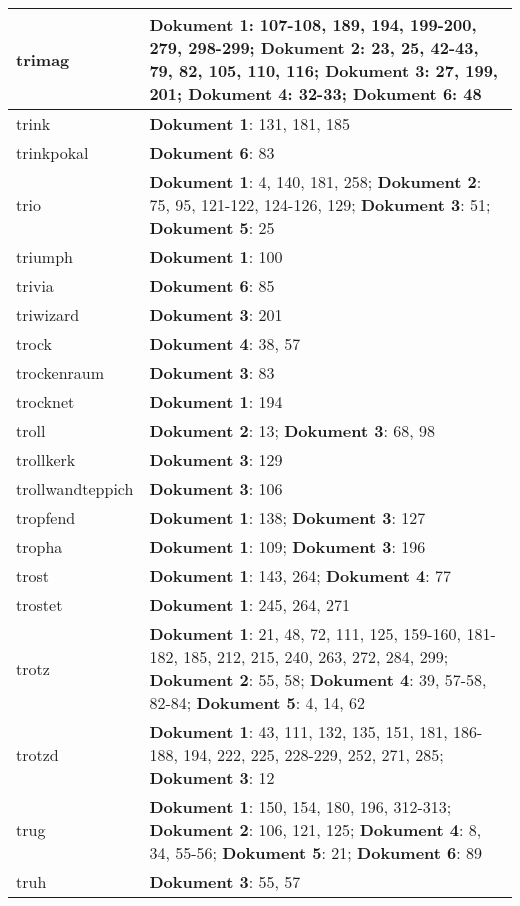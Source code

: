 \documentclass[a5paper]{article}
\begin{document}
\begin{longtable}[l]{|l|p{3in}|}
\hline
trimag & \textbf{Dokument 1}: 107-108, 189, 194, 199-200, 279, 298-299; \textbf{Dokument 2}: 23, 25, 42-43, 79, 82, 105, 110, 116; \textbf{Dokument 3}: 27, 199, 201; \textbf{Dokument 4}: 32-33; \textbf{Dokument 6}: 48 \\
\hline
trink & \textbf{Dokument 1}: 131, 181, 185 \\
\hline
trinkpokal & \textbf{Dokument 6}: 83 \\
\hline
trio & \textbf{Dokument 1}: 4, 140, 181, 258; \textbf{Dokument 2}: 75, 95, 121-122, 124-126, 129; \textbf{Dokument 3}: 51; \textbf{Dokument 5}: 25 \\
\hline
triumph & \textbf{Dokument 1}: 100 \\
\hline
trivia & \textbf{Dokument 6}: 85 \\
\hline
triwizard & \textbf{Dokument 3}: 201 \\
\hline
trock & \textbf{Dokument 4}: 38, 57 \\
\hline
trockenraum & \textbf{Dokument 3}: 83 \\
\hline
trocknet & \textbf{Dokument 1}: 194 \\
\hline
troll & \textbf{Dokument 2}: 13; \textbf{Dokument 3}: 68, 98 \\
\hline
trollkerk & \textbf{Dokument 3}: 129 \\
\hline
trollwandteppich & \textbf{Dokument 3}: 106 \\
\hline
tropfend & \textbf{Dokument 1}: 138; \textbf{Dokument 3}: 127 \\
\hline
tropha & \textbf{Dokument 1}: 109; \textbf{Dokument 3}: 196 \\
\hline
trost & \textbf{Dokument 1}: 143, 264; \textbf{Dokument 4}: 77 \\
\hline
trostet & \textbf{Dokument 1}: 245, 264, 271 \\
\hline
trotz & \textbf{Dokument 1}: 21, 48, 72, 111, 125, 159-160, 181-182, 185, 212, 215, 240, 263, 272, 284, 299; \textbf{Dokument 2}: 55, 58; \textbf{Dokument 4}: 39, 57-58, 82-84; \textbf{Dokument 5}: 4, 14, 62 \\
\hline
trotzd & \textbf{Dokument 1}: 43, 111, 132, 135, 151, 181, 186-188, 194, 222, 225, 228-229, 252, 271, 285; \textbf{Dokument 3}: 12 \\
\hline
trug & \textbf{Dokument 1}: 150, 154, 180, 196, 312-313; \textbf{Dokument 2}: 106, 121, 125; \textbf{Dokument 4}: 8, 34, 55-56; \textbf{Dokument 5}: 21; \textbf{Dokument 6}: 89 \\
\hline
truh & \textbf{Dokument 3}: 55, 57 \\

\end{longtable}
\end{document}
